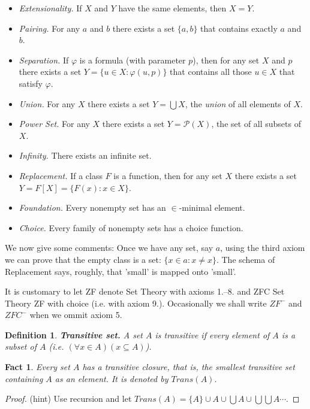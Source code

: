 \documentclass[a4paper,11pt,oneside]{mybook}
\def\pw{{{\mathcal P}}}
\theoremstyle{theorem}
\newtheorem{fact}[subsection]{Fact}
\newtheorem{definition}[subsection]{Definition}
\theoremstyle{example}
\begin{document}
{\begin{itemize}
\item[1.]\emph{Extensionality.} If $X$ and $Y$ have the same elements, then
$X=Y$.
\item[2.]\emph{Pairing.} For any $a$ and $b$ there exists a set $\{a, b\}$ that
contains exactly $a$ and $b$.
\item[3.]\emph{Separation.} If $\varphi$ is a formula (with parameter $p$),
then for any set $X$ and $p$ there exists a set $Y = \{u \in X : \varphi(u, p)\}$ that contains
all those $u \in X$ that satisfy $\varphi$.
\item[4.]\emph{Union.} For any $X$ there exists a set $Y =\bigcup X$, the \emph{union}
of all elements of $X$.
\item[5.]\emph{Power Set.} For any $X$ there exists a set $Y = \pw (X)$, the
set of all subsets of $X$.
\item[6.]\emph{Infinity.} There exists an infinite set.
\item[7.]\emph{Replacement.} If a class $F$ is a function, then for
any set $X$ there exists a set $Y = F[X] = \{F (x) : x \in X\}$.
\item[8.]\emph{Foundation.} Every nonempty set has an $\in$-minimal element.
\item[9.]\emph{Choice.} Every family of nonempty sets has a choice function.
\end{itemize}

We now give some comments: Once we have any set, say $a$, using the third axiom we can prove
that the empty class is a set: $\{x\in a:x\neq x\}$. The schema of Replacement says, roughly,
that 'small' is mapped onto 'small'.

\smallskip

It is customary to let ZF denote Set Theory with axioms 1.--8. and ZFC Set Theory ZF with choice
(i.e. with axiom 9.). Occasionally we shall write $ZF^-$ and $ZFC^-$ when we ommit axiom 5.

\begin{definition}\label{ts}
{\bf Transitive set.} A set $A$ is \emph{transitive} if every element of $A$
 is a subset of $A$ (i.e. $(\forall x\in A)(x\subseteq A)$).
\end{definition}

\begin{fact} Every set $A$ has a \emph{transitive closure}, that is, the smallest transitive
 set containing $A$ as an element. It is denoted by $Trans(A)$.
\end{fact}
\begin{proof} (hint) Use recursion and let $Trans(A)=\{A\}\cup A\cup \bigcup A\cup \bigcup\bigcup A\cdots$.
\end{proof}

}
\end{document}
